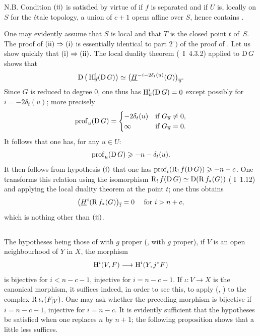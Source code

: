 N.B. Condition $\textup{(ii)}$ is satisfied by virtue of  if $f$ is separated and if $U$ is, locally on $S$ for the \'etale topology, a union of $c+1$ opens affine over $S$, hence  contains .

One may evidently assume that $S$ is local and that $T$ is the closed point $t$ of~$S$. The proof of $\textup{(ii)}\ALORS\textup{(i)}$ is essentially identical to part $2^\circ)$ of the proof of . Let us show quickly that $\textup{(i)}\ALORS \textup{(ii)}$. The local duality theorem (~I~4.3.2) applied to $\operatorname{D} G$ shows that
$$
\operatorname{D}\big(\operatorname{H}_{\overline{u}}^{i}(\operatorname{D} G)\big) \simeq\big(\underline{H}^{-i-2\delta_{t}(u)}(G)\big)_{\overline{u}}.
$$
Since $G$ is reduced to degree $0$, one thus has $\operatorname{H}_{\overline{u}}^{i}(\operatorname{D} G)=0$ except possibly for $i=-2\delta_{t}(u)$; more precisely
\[
\operatorname{prof}_{u}(\operatorname{D} G)=
\begin{cases}
-2\delta_{t}(u) &\text{if } G_{\overline{u}}\neq 0, \\
\infty &\text{if } G_{\overline{u}}=0.
\end{cases}
\]
It follows that one has, for any $u\in U$:
$$
\operatorname{prof}_{u}(\operatorname{D} G)\geqslant -n-\delta_{t}(u).
$$
It then follows from hypothesis $\textup{(i)}$ that one has $\operatorname{prof}_{t}(\operatorname{R}_{!}f(\operatorname{D} G))\geqslant -n-c$. One transforms this relation using the isomorphism $\operatorname{R}_{!}f(\operatorname{D} G)\simeq\operatorname{D}(\operatorname{R} f_{\ast}(G))$ ( I~1.12) and applying the local duality theorem at the point $t$; one thus obtains
$$
\big(\underline{H}^{i}(\operatorname{R} f_{\ast}(G)\big)_{\overline{t}}=0\quad\textrm{ for }i>n+c,
$$
which is nothing other than $\textup{(ii)}$.

\subsection{} \label{XIV.4.8} The hypotheses being those of  with $g$ proper (\resp {}, \resp {} with $g$ proper), if $V$ is an open neighbourhood of $Y$ in $X$, the morphism
$$
\H^{i}(V, F)\to\H^{i}(Y, j^{\ast}F)$$
is bijective for $i<n-c-1$, injective for $i=n-c-1$. If $\iota\colon V\to X$ is the canonical morphism, it suffices indeed, in order to see this, to apply  (\resp {}, \resp {}) to the complex $\operatorname{R} \iota_{\ast}(F_{|V})$. One may ask whether the preceding morphism is bijective if $i=n-c-1$, injective for $i=n-c$. It is evidently sufficient that the hypotheses be satisfied when one replaces $n$ by $n+1$; the following proposition shows that a little less suffices.

